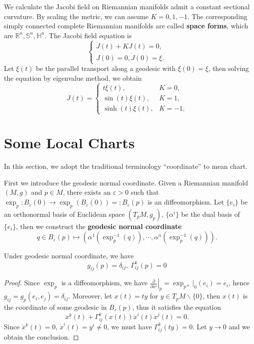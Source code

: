 \begin{eg}
    We calculate the Jacobi field on Riemannian manifolds admit a constant sectional curvature.
    By scaling the metric, we can assume $K=0,1,-1$.
    The corresponding simply connected complete Riemannian manifolds are called \textbf{space forms}, which are $\mathbb{R}^n,\mathbb{S}^n,\mathbb{H}^n$.
    The Jacobi field equation is
    \[\begin{cases}
        \ddot{J}(t)+KJ(t)=0,\\
        J(0)=0,\dot{J}(0)=\xi.
    \end{cases}\]
    Let $\xi(t)$ be the parallel transport along a geodesic with $\xi(0)=\xi$, then solving the equation by eigenvalue method, we obtain
    \[J(t)=\begin{cases}
        t\xi(t), & K=0,\\
        \sin(t)\xi(t), & K=1,\\
        \sinh(t)\xi(t), & K=-1.
    \end{cases}\]
\end{eg}

\section{Some Local Charts}
In this section, we adopt the traditional terminology ``coordinate'' to mean chart.

First we introduce the geodesic normal coordinate.
Given a Riemannian manifold $(M,g)$ and $p\in M$, there exists an $\varepsilon>0$ such that $\exp_p:B_\varepsilon(0)\to\exp_p(B_\varepsilon(0))=:B_\varepsilon(p)$ is an diffeomorphism.
Let $\{e_i\}$ be an orthonormal basis of Euclidean space $(T_pM,g_p)$, $\{\alpha^i\}$ be the dual basis of $\{e_i\}$, then we construct the \textbf{geodesic normal coordinate}
\[q\in B_\varepsilon(p)\mapsto(\alpha^1(\exp_p^{-1}(q)),\cdots,\alpha^n(\exp_p^{-1}(q))).\]

\begin{prop}
    Under geodesic normal coordinate, we have
    \[g_{ij}(p)=\delta_{ij},\ \Gamma^k_{ij}(p)=0\]
\end{prop}
\begin{proof}
    Since $\exp_p$ is a diffeomorphism, we have $\left.\frac{\partial{}}{\partial{x^i}}\right|_p=\exp_{p*}|_0(e_i)=e_i$, hence $g_{ij}=g_p(e_i,e_j)=\delta_{ij}$.
    Moreover, let $x(t)=ty$ for $y\in T_pM\backslash\{0\}$, then $x(t)$ is the coordinate of some geodesic in $B_\varepsilon(p)$, thus it satisfies the equation
    \[\ddot{x}^k(t)+\Gamma^k_{ij}(x(t))\dot{x}^i(t)\dot{x}^j(t)=0.\]
    Since $\ddot{x}^k(t)=0$, $\dot{x}^i(t)=y^i\neq 0$, we must have $\Gamma^k_{ij}(ty)=0$.
    Let $y\to 0$ and we obtain the conclusion.
\end{proof}

